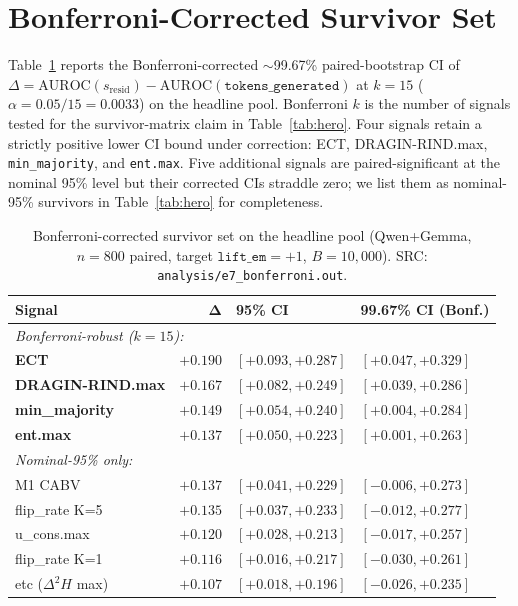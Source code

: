 \documentclass[11pt]{article}
\begin{document}
\appendix

\section{Bonferroni-Corrected Survivor Set}
\label{sec:results-bonferroni}
\label{sec:appendix-bonferroni}

Table~\ref{tab:bonferroni} reports the Bonferroni-corrected
$\sim$99.67\% paired-bootstrap CI of $\Delta = \mathrm{AUROC}(s_{\text{resid}})
- \mathrm{AUROC}(\texttt{tokens\_generated})$ at $k{=}15$
($\alpha = 0.05/15 = 0.0033$) on the headline pool. Bonferroni $k$ is the
number of signals tested for the survivor-matrix claim in
Table~\ref{tab:hero}. Four signals retain a strictly positive lower CI bound
under correction: ECT, DRAGIN-RIND.max, \texttt{min\_majority}, and
\texttt{ent.max}. Five additional signals are paired-significant at the
nominal 95\% level but their corrected CIs straddle zero; we list them as
nominal-95\% survivors in Table~\ref{tab:hero} for completeness.

\begin{table}[h]
\centering\small
\begin{tabular}{@{}lrll@{}}
\toprule
\textbf{Signal} & $\boldsymbol{\Delta}$ & \textbf{95\% CI} &
\textbf{99.67\% CI (Bonf.)} \\
\midrule
\multicolumn{4}{l}{\textit{Bonferroni-robust ($k{=}15$):}} \\
\midrule
\textbf{ECT}            & $+0.190$ & $[+0.093, +0.287]$ & $[+0.047, +0.329]$ \\
\textbf{DRAGIN-RIND.max}   & $+0.167$ & $[+0.082, +0.249]$ & $[+0.039, +0.286]$ \\
\textbf{min\_majority} & $+0.149$ & $[+0.054, +0.240]$ & $[+0.004, +0.284]$ \\
\textbf{ent.max}           & $+0.137$ & $[+0.050, +0.223]$ & $[+0.001, +0.263]$ \\
\midrule
\multicolumn{4}{l}{\textit{Nominal-95\% only:}} \\
\midrule
M1 CABV                    & $+0.137$ & $[+0.041, +0.229]$ & $[-0.006, +0.273]$ \\
flip\_rate K=5         & $+0.135$ & $[+0.037, +0.233]$ & $[-0.012, +0.277]$ \\
u\_cons.max                & $+0.120$ & $[+0.028, +0.213]$ & $[-0.017, +0.257]$ \\
flip\_rate K=1         & $+0.116$ & $[+0.016, +0.217]$ & $[-0.030, +0.261]$ \\
etc ($\Delta^2 H$ max)     & $+0.107$ & $[+0.018, +0.196]$ & $[-0.026, +0.235]$ \\
\bottomrule
\end{tabular}
\caption{Bonferroni-corrected survivor set on the headline pool
(Qwen+Gemma, $n{=}800$ paired, target $\texttt{lift\_em}{=}+1$,
$B{=}10{,}000$). SRC: \texttt{analysis/e7\_bonferroni.out}.}
\label{tab:bonferroni}
\end{table}
\end{document}
